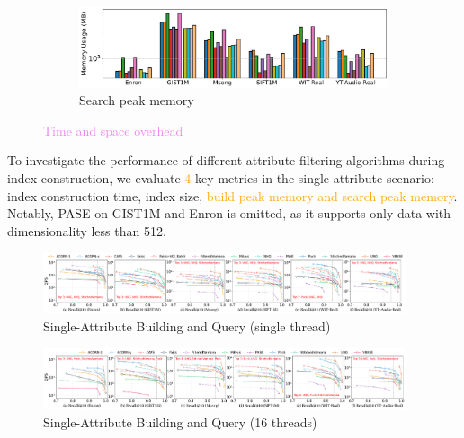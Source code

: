 \documentclass[sigconf, nonacm]{acmart}
\begin{document}
\begin{figure}[t]
		\begin{subfigure}{\columnwidth}
			\centering
			
			\includegraphics[width=0.95\linewidth]{figures/searchMem/label_memory_comparison.pdf}
			\caption{Search peak memory}
			\label{fig:search_memory_mb_comparison}
		\end{subfigure}
		
		\caption{\textcolor{violet}{Time and space overhead}}
		\label{fig:build_index_comparison}
	\end{figure}
	
	
	
	To investigate the performance of different attribute filtering algorithms during index construction, we evaluate \textcolor{orange}{4} key metrics in the single-attribute scenario: index construction time, index size, \textcolor{orange}{build peak memory and search peak memory}. Notably, PASE on GIST1M and Enron is omitted, as it supports only data with dimensionality less than 512. 
	
	\begin{figure}
		\centering
		
		\includegraphics[width=0.95\textwidth]{figures/exp/exp_1_1_SingleLabel_1thread.pdf}
		\caption{Single-Attribute Building and Query (single thread) }
		\label{fig:exp_1_1_SingleLabel_1thread}
	\end{figure}
	
	\begin{figure}
		\centering
		
		\includegraphics[width=0.95\textwidth]{figures/exp/exp_1_2_SingleLabel_16thread.pdf}
		\caption{Single-Attribute Building and Query (16 threads)}
		\label{fig:exp_1_2_SingleLabel_16thread}
	\end{figure}
	
\end{document}
